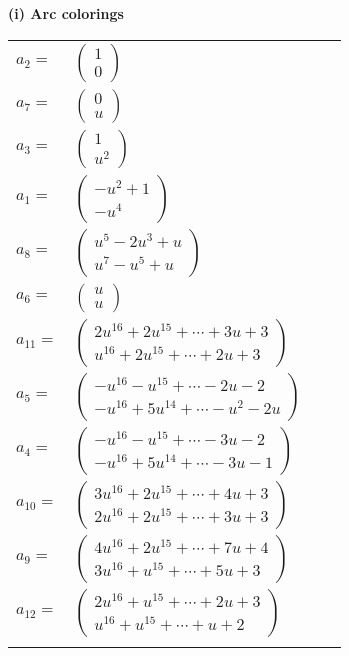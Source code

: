 \documentclass[1p]{elsarticle_modified}
\theoremstyle{definition}
\begin{document}
\flushleft \textbf{(i) Arc colorings}\\
\begin{tabular}{m{7pt} m{180pt} m{7pt} m{180pt} }
\flushright $a_{2}=$&$\begin{pmatrix}1\\0\end{pmatrix}$ \\
\flushright $a_{7}=$&$\begin{pmatrix}0\\u\end{pmatrix}$ \\
\flushright $a_{3}=$&$\begin{pmatrix}1\\u^2\end{pmatrix}$ \\
\flushright $a_{1}=$&$\begin{pmatrix}- u^2+1\\- u^4\end{pmatrix}$ \\
\flushright $a_{8}=$&$\begin{pmatrix}u^5-2 u^3+u\\u^7- u^5+u\end{pmatrix}$ \\
\flushright $a_{6}=$&$\begin{pmatrix}u\\u\end{pmatrix}$ \\
\flushright $a_{11}=$&$\begin{pmatrix}2 u^{16}+2 u^{15}+\cdots+3 u+3\\u^{16}+2 u^{15}+\cdots+2 u+3\end{pmatrix}$ \\
\flushright $a_{5}=$&$\begin{pmatrix}- u^{16}- u^{15}+\cdots-2 u-2\\- u^{16}+5 u^{14}+\cdots- u^2-2 u\end{pmatrix}$ \\
\flushright $a_{4}=$&$\begin{pmatrix}- u^{16}- u^{15}+\cdots-3 u-2\\- u^{16}+5 u^{14}+\cdots-3 u-1\end{pmatrix}$ \\
\flushright $a_{10}=$&$\begin{pmatrix}3 u^{16}+2 u^{15}+\cdots+4 u+3\\2 u^{16}+2 u^{15}+\cdots+3 u+3\end{pmatrix}$ \\
\flushright $a_{9}=$&$\begin{pmatrix}4 u^{16}+2 u^{15}+\cdots+7 u+4\\3 u^{16}+u^{15}+\cdots+5 u+3\end{pmatrix}$ \\
\flushright $a_{12}=$&$\begin{pmatrix}2 u^{16}+u^{15}+\cdots+2 u+3\\u^{16}+u^{15}+\cdots+u+2\end{pmatrix}$\\&\end{tabular}
\end{document}
